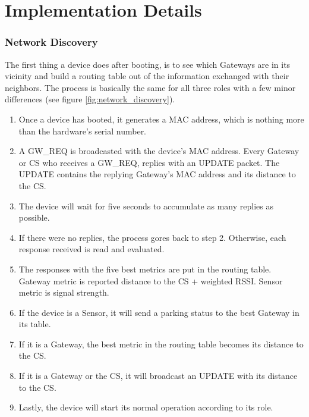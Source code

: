 ﻿\chapter{Implementation Details}
\label{chap:implementation_details}

\subsection{Network Discovery}
\label{sec:network_discovery}
The first thing a device does after booting, is to see which Gateways are in its vicinity and build a routing table out of the information exchanged with their neighbors.
The process is basically the same for all three roles with a few minor differences (see figure \ref{fig:network_discovery}).

\begin{enumerate} [noitemsep]
	\item Once a device has booted, it generates a MAC address, which is nothing more than the hardware's serial number.
	\item A GW\_REQ is broadcasted with the device's MAC address.
		Every Gateway or CS who receives a GW\_REQ, replies with an UPDATE packet. 
		The UPDATE contains the replying Gateway's MAC address and its distance to the CS.
	\item The device will wait for five seconds to accumulate as many replies as possible.
	\item If there were no replies, the process gores back to step 2. 
		Otherwise, each response received is read and evaluated.
	\item The responses with the five best metrics are put in the routing table.
		Gateway metric is reported distance to the CS + weighted RSSI.
		Sensor metric is signal strength.
	\item If the device is a Sensor, it will send a parking status to the best Gateway in its table.
	\item If it is a Gateway, the best metric in the routing table becomes its distance to the CS.
	\item If it is a Gateway or the CS, it will broadcast an UPDATE with its distance to the CS.
	\item Lastly, the device will start its normal operation according to its role.
\end{enumerate}

